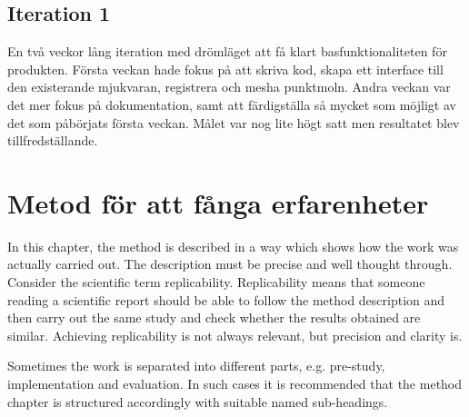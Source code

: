 \subsection{Iteration 1}
En två veckor lång iteration med drömläget att få klart basfunktionaliteten för produkten. Första veckan hade fokus på att skriva kod, skapa ett interface till den existerande mjukvaran, registrera och mesha punktmoln. Andra veckan var det mer fokus på dokumentation, samt att färdigställa så mycket som möjligt av det som påbörjats första veckan. Målet var nog lite högt satt men resultatet blev tillfredställande.

\section{Metod för att fånga erfarenheter}

In this chapter, the method is described in a way which shows how the
work was actually carried out. The description must be precise and
well thought through. Consider the scientific term
replicability. Replicability means that someone reading a scientific
report should be able to follow the method description and then carry
out the same study and check whether the results obtained are
similar. Achieving replicability is not always relevant, but precision
and clarity is.

Sometimes the work is separated into different parts, e.g.  pre-study,
implementation and evaluation. In such cases it is recommended that
the method chapter is structured accordingly with suitable named
sub-headings.

